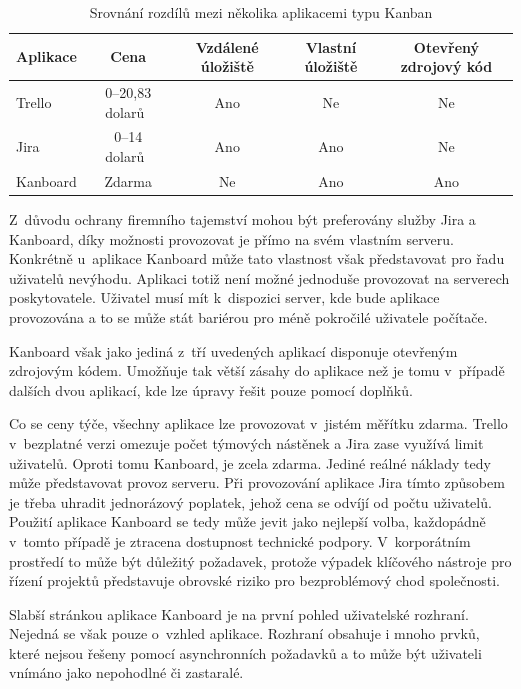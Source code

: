 \begin{table}[H]
\centering
\caption{Srovnání rozdílů mezi několika aplikacemi typu Kanban}
\label{tab:kanban-sum}
\begin{tabular}{ |l|c|c|c|c| } 
\hline
Aplikace & Cena\footnotemark                         & Vzdálené úložiště & Vlastní úložiště & Otevřený zdrojový kód  \\
\hline
Trello   & 0--20,83 dolarů~\cite{bib:trello-pricing} & Ano               & Ne               & Ne                     \\ 
Jira     & 0--14 dolarů~\cite{bib:jira-pricing}      & Ano               & Ano              & Ne                     \\ 
Kanboard & Zdarma                                    & Ne                & Ano              & Ano                    \\ 
\hline
\end{tabular}
\end{table}

Z~důvodu ochrany firemního tajemství mohou být preferovány služby Jira a Kanboard, díky možnosti provozovat je přímo na svém vlastním serveru. Konkrétně u~aplikace Kanboard může tato vlastnost však představovat pro řadu uživatelů nevýhodu. Aplikaci totiž není možné jednoduše provozovat na serverech poskytovatele. Uživatel musí mít k~dispozici server, kde bude aplikace provozována a to se může stát bariérou pro méně pokročilé uživatele počítače.

Kanboard však jako jediná z~tří uvedených aplikací disponuje otevřeným zdrojovým kódem. Umožňuje tak větší zásahy do aplikace než je tomu v~případě dalších dvou aplikací, kde lze úpravy řešit pouze pomocí doplňků.

Co se ceny týče, všechny aplikace lze provozovat v~jistém měřítku zdarma. Trello v~bezplatné verzi omezuje počet týmových nástěnek a Jira zase využívá limit uživatelů. Oproti tomu Kanboard, je zcela zdarma. Jediné reálné náklady tedy může představovat provoz serveru. Při provozování aplikace Jira tímto způsobem je třeba uhradit jednorázový poplatek, jehož cena se odvíjí od počtu uživatelů. Použití aplikace Kanboard se tedy může jevit jako nejlepší volba, každopádně v~tomto případě je ztracena dostupnost technické podpory. V~korporátním prostředí to může být důležitý požadavek, protože výpadek klíčového nástroje pro řízení projektů představuje obrovské riziko pro bezproblémový chod společnosti.

Slabší stránkou aplikace Kanboard je na první pohled uživatelské rozhraní. Nejedná se však pouze o~vzhled aplikace. Rozhraní obsahuje i mnoho prvků, které nejsou řešeny pomocí asynchronních požadavků a to může být uživateli vnímáno jako nepohodlné či zastaralé.

